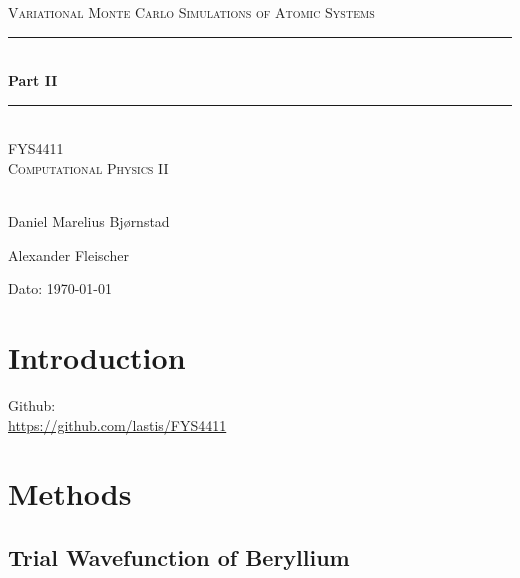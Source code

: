\documentclass[twocolumn,8pt]{extarticle}
\title{}
\begin{document}
\begin{titlepage}
\begin{center}

\textsc{\Large Variational Monte Carlo Simulations of
Atomic Systems}\\[0.5cm]
\rule{\linewidth}{0.5mm} \\[0.4cm]
{ \huge \bfseries  Part II}\\[0.10cm]
\rule{\linewidth}{0.5mm} \\[1.5cm]
\textsc{\Large FYS4411}\\
\textsc{\Large Computational Physics II}\\[1.5cm]
\textsc{}\\[1.5cm]

\begin{minipage}{0.49\textwidth}
    \begin{center} \large
		Daniel Marelius Bj\o rnstad
    \end{center}
\end{minipage}
\begin{minipage}{0.49\textwidth}
    \begin{center} \large
        Alexander Fleischer
    \end{center}
\end{minipage}

\vfill

\large{Dato: \today}

\end{center}
\end{titlepage}

\maketitle

\section{Introduction}
Github: \\ \url{https://github.com/lastis/FYS4411}

\section{Methods}
\subsection{Trial Wavefunction of Beryllium}
\end{document}
